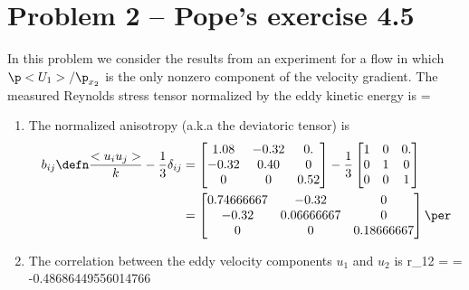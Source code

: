 \documentclass[11pt]{article}
\begin{document}
\section*{Problem 2 -- Pope's exercise 4.5}
In this problem we consider the results from an experiment for a flow in which $\p <U_1>/\p_{x_2}$ is the only nonzero component of the velocity gradient. The measured Reynolds stress tensor normalized by the eddy kinetic energy is
\beq
            \label{eq:reynolds}
 =  \left[ \begin{matrix}
        1.08 & -0.32 & 0. \\
        -0.32 & 0.40 & 0 \\
        0 & 0 & 0.52
\end{matrix} \right]\per
\eeq

\begin{enumerate}[label=(\alph*)]
    \item The normalized anisotropy (a.k.a the deviatoric tensor)  is
        \begin{align}
            b_{ij} \defn \frac{<u_i u_j>}{k} - \frac{1}{3}\delta_{ij} &=  \left[ \begin{matrix}
        1.08 & -0.32 & 0. \\
        -0.32 & 0.40 & 0 \\
        0 & 0 & 0.52
\end{matrix} \right] - \frac{1}{3} \left[ \begin{matrix}
        1 & 0 & 0. \\
        0 & 1 & 0 \\
        0 & 0 & 1
\end{matrix} \right] \nonumber \\  &= \left[ \begin{matrix}
        0.74666667 & -0.32 & 0 \\
        -0.32 &  0.06666667 &  0   \\
0 &  0 &0.18666667\end{matrix} \right]\per
    \end{align}

    \item The correlation between the eddy velocity components $u_1$ and $u_2$ is
        \beq
            r_{12} =  = -0.48686449556014766\per
            \eeq



\end{enumerate}
\end{document}
